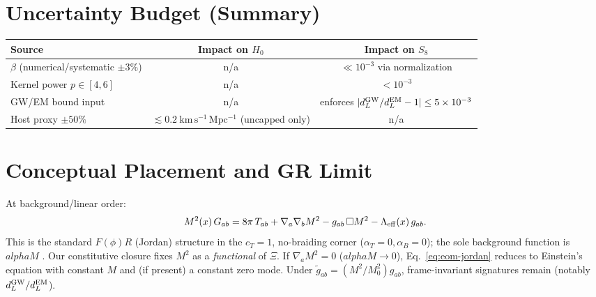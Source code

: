 \documentclass[aps,prd,onecolumn,superscriptaddress,nofootinbib]{revtex4-2}
\def\alphaM{alphaM}%
\newcommand{\alphaM}{\alpha_M}
\begin{document}
\section{Uncertainty Budget (Summary)}
\label{sec:uncertainty}
\begin{center}
\begin{tabular}{l|c|c}
\hline
Source & Impact on $H_0$ & Impact on $S_8$ \\
\hline
$\beta$ (numerical/systematic $\pm 3\%$) & n/a & $\ll 10^{-3}$ via normalization \\
Kernel power $p\in[4,6]$ & n/a & $<10^{-3}$ \\
GW/EM bound input & n/a & enforces $|d_L^{\rm GW}/d_L^{\rm EM}-1|\le 5\times10^{-3}$ \\
Host proxy $\pm 50\%$ & $\lesssim 0.2\ \mathrm{km\,s^{-1}\,Mpc^{-1}}$ (uncapped only) & n/a \\
\hline
\end{tabular}
\end{center}

\section{Conceptual Placement and GR Limit}
\label{sec:GR-Horndeski}
At background/linear order:
\begin{equation}
\label{eq:eom-jordan}
M^2(x)\, G_{ab}
= 8\pi\, T_{ab}
+ \nabla_a\nabla_b M^2
- g_{ab}\,\Box M^2
- \Lambda_{\rm eff}(x)\, g_{ab}.
\end{equation}
This is the standard $F(\phi)R$ (Jordan) structure in the $c_T=1$, no-braiding corner ($\alpha_T=0,\alpha_B=0$); the sole background function is $\alphaM$ \cite{BelliniSawicki2014}. Our constitutive closure fixes $M^2$ as a \emph{functional} of $\Xi$. If $\nabla_a M^2=0$ ($\alphaM\to 0$), Eq.~\eqref{eq:eom-jordan} reduces to Einstein’s equation with constant $M$ and (if present) a constant zero mode. Under $\tilde g_{ab}=(M^2/M_0^2)g_{ab}$, frame-invariant signatures remain (notably $d_L^{\rm GW}/d_L^{\rm EM}$).

\end{document}

